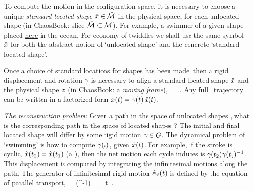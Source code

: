 To compute the motion in the configuration space, it is necessary to
choose a unique \emph{standard located shape} $\hat{x} \in {\ensuremath{\hat{\cal M}}}$ in
the physical space, for each unlocated shape (in ChaosBook: slice
${\hat{\cal M}} \subset {\ensuremath{\mathcal{M}}}$). For example, a swimmer of a given shape placed
\underline{here} in the ocean. For economy of twiddles we shall use the
same symbol $\hat{x}$ for both the abstract notion of `unlocated shape'
and the concrete `standard located shape'.

Once a choice of standard locations for
shapes has been made, then a rigid displacement and rotation $\gamma$
is necessary to align a standard located shape $\hat{x}$  and the
physical shape $x$ (in ChaosBook: a \emph{moving frame}),
\beq
\ssp=\LieEl\,\sspRed
\,.
Any full \statesp\ trajectory can be written in a factorized
form $x(t)=\gamma(t)\,\hat{x}(t)$.

\emph{The reconstruction problem}: Given a path in the space of unlocated
shapes {\pSRed}, what is the corresponding path in the space of located
shapes {\pS}?
The initial and final located shape will differ by some rigid
motion $\gamma \in G$.
The dynamical problem of `swimming' is how to
compute $\gamma(t)$, given $\hat{x}(t)$.
For example, if
the stroke is cyclic, $\hat{x}(t_2)= \hat{x}(t_1)$
(a \rpo), then the
net motion each cycle induces is $\gamma(t_2)\gamma(t_1)^{-1}$.
This displacement is
computed by integrating the
infinitesimal motions  along the path.
The generator of infinitesimal rigid motion $\mathbb{A}_t(t)$
is defined by the equation of parallel transport,
\beq
{} = \LieEl \left(\LieEl^{-1}\right)
= \LieEl {}_t
\,.


